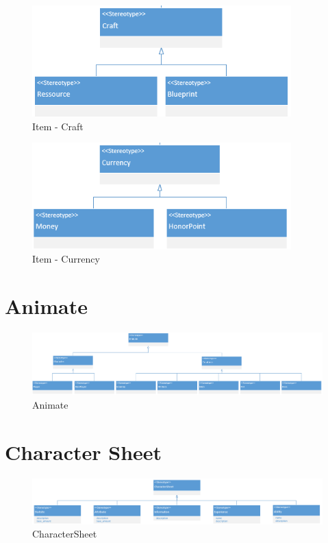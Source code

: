 \begin{figure}[H]
    \includegraphics[width=10cm]{10_img/Z_annexeA/item_craft.PNG} 
    \caption{Item - Craft}
\end{figure}

\begin{figure}[H]
    \includegraphics[width=10cm]{10_img/Z_annexeA/item_currency.PNG} 
    \caption{Item - Currency}
\end{figure}


\section*{Animate}
\begin{figure}
    \includegraphics[width=20cm]{10_img/Z_annexeA/animate.PNG} 
    \caption{Animate}
\end{figure}



\section*{Character Sheet} 
\begin{figure}
    \includegraphics[width=20cm]{10_img/Z_annexeA/cs_racine.PNG} 
    \caption{CharacterSheet}
\end{figure}

